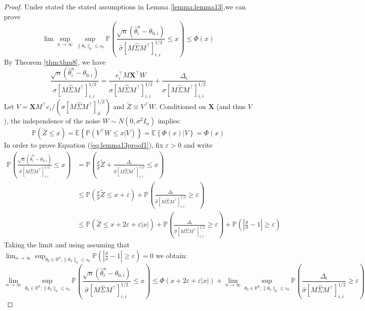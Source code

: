 \documentclass[10pt,a4paper]{amsart}
\begin{document}
\begin{proof}
    Under stated the stated assumptions in Lemma \ref{lemma:lemma13},we can prove 
    \begin{equation}
    \label{eq:lemma13proof1}
        \lim \sup_{n \to \infty}\sup_{\|\theta_0\|_0 \le s_0}\mathbb{P}\left(\frac{\sqrt{n}(\hat{\theta}^u_i - \theta_{0,i})}{\hat{\sigma} [M \hat{\Sigma}M^{\top}]_{i,i}^{1/2}}  \le x \right) \le \Phi(x)
    \end{equation}
    By Theorem \ref{thm:thm8}, we have
    $$
    \frac{\sqrt{n}(\hat{\theta}_i^u - \theta_{0, i})}{\sigma [M \hat{\Sigma} M^\top]^{1/2}_{i,i}} = \frac{e^{\top}_i M \mathbf{X}^\top W}{\sigma [M \hat{\Sigma} M^\top]^{1/2}_{i,i}} + \frac{\Delta_i}{\sigma [M \hat{\Sigma} M^\top]^{1/2}_{i,i}}
    $$
    Let $V = \mathbf{X}M^\top e_i / (\sigma [M \hat{\Sigma} M^\top]_{ii}^{1/2})$ and $\tilde{Z} \equiv V^\top W$. Conditioned on $\mathbf{X}$ (and thus $V$), the independence of the noise $W \sim N(0, \sigma^2 I_n)$ implies:
    $$
    \mathbb{P}( \tilde{Z} \le x) = \mathbb{E}\left\{\mathbb{P}(V^\top W\le x|V) \right\} = \mathbb{E}\left\{\Phi(x) | V \right\} = \Phi(x)
    $$
    In order to prove Equation (\ref{eq:lemma13proof1}), fix $\varepsilon >0$ and write
    $$
    \begin{aligned}
    \mathbb{P}\left(\frac{\sqrt{n}(\hat{\theta}^u_i - \theta_{0,i})}{\hat{\sigma} [M \hat{\Sigma}M^{\top}]_{i,i}^{1/2}}  \le x \right) &= \mathbb{P}\left(\frac{\sigma}{\hat{\sigma}}\tilde{Z} +  \frac{\Delta_i}{\hat{\sigma}[M \hat{\Sigma}M^\top]^{1/2}_{i,i}}  \le x \right)\\
    &\le \mathbb{P}\left(\frac{\sigma}{\hat{\sigma}}\tilde{Z} \le x + \varepsilon \right) + \mathbb{P}\left( \frac{\Delta_i}{\hat{\sigma}[M \hat{\Sigma}M^\top]^{1/2}_{i,i}}  \ge \varepsilon\right)\\
    &\le \mathbb{P}\left(\tilde{Z} \le x + 2\varepsilon + \varepsilon|x| \right) + \mathbb{P}\left( \frac{\Delta_i}{\hat{\sigma}[M \hat{\Sigma}M^\top]^{1/2}_{i,i}}  \ge \varepsilon\right) + \mathbb{P}\left(\left|\frac{\hat{\sigma}}{\sigma} - 1\right| \ge \varepsilon \right)
    \end{aligned}
    $$
    Taking the limit and using assuming that $\lim_{n \to \infty} \sup_{\theta_0 \in \mathbb{R}^p; \|\theta_0\|_0 \le s_0}\mathbb{P}\left(\left|\frac{\hat{\sigma}}{\sigma} - 1\right| \ge \varepsilon \right) = 0$ we obtain:
    $$
          \lim_{n \to \infty} \sup_{\theta_0 \in \mathbb{R}^p; \|\theta_0\|_0 \le s_0}\mathbb{P}\left(\frac{\sqrt{n}(\hat{\theta}^u_i - \theta_{0,i})}{\hat{\sigma} [M \hat{\Sigma}M^{\top}]_{i,i}^{1/2}}  \le x \right) \le \Phi(x + 2\varepsilon + \varepsilon |x| ) + \lim_{n \to \infty} \sup_{\theta_0 \in \mathbb{R}^p; \|\theta_0\|_0  \le s_0} \mathbb{P}\left( \frac{\Delta_i}{\hat{\sigma}[M \hat{\Sigma}M^\top]^{1/2}_{i,i}}  \ge \varepsilon\right)
$$
\end{proof}
\end{document}
